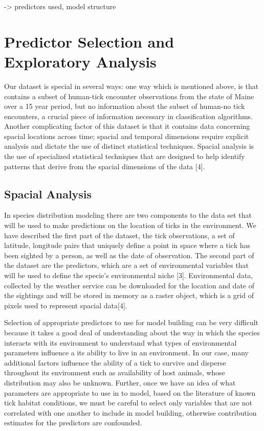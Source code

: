 -> predictors used, model structure \newline



\section{Predictor Selection and Exploratory Analysis}
Our dataset is special in several ways: one way which is mentioned above, is that contains a subset of human-tick encounter observations from the state of Maine over a 15 year period, but no information about the subset of human-no tick encounters, a crucial piece of information necessary in classification algorithms. Another complicating factor of this dataset is that it contains data concerning spacial locations across time; spacial and temporal dimensions require explicit analysis and dictate the use of distinct statistical techniques. Spacial analysis is the use of specialized statistical techniques that are designed to help identify patterns that derive from the spacial dimensions of the data [4]. \newline

\subsection{Spacial Analysis}
In species distribution modeling there are two components to the data set that will be used to make predictions on the location of ticks in the environment. We have described the first part of the dataset, the tick observations, a set of latitude, longitude pairs that uniquely define a point in space where a tick has been sighted by a person, as well as the date of observation. The second part of the dataset are the predictors, which are a set of environmental variables that will be used to define the specie's environmental niche [3]. Environmental data, collected by the weather service can be downloaded for the location and date of the sightings and will be stored in memory as a raster object, which is a grid of pixels used to represent spacial data[4].  \newline

\noindent Selection of appropriate predictors to use for model building can be very difficult because it takes a good deal of understanding about the way in which the species interacts with its environment to understand what types of environmental parameters influence a its ability to live in an environment. In our case, many additional factors influence the ability of a tick to survive and disperse throughout its environment such as availability of host animals, whose distribution may also be unknown. Further, once we have an idea of what parameters are appropriate to use in to model, based on the literature of known tick habitat conditions, we must be careful to select only variables that are not correlated with one another to include in model building, otherwise contribution estimates for the predictors are confounded. \newline

